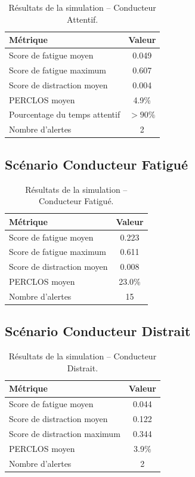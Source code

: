 \documentclass[12pt,a4paper,twoside]{report}
\begin{document}
\begin{table}[H]
\centering
\caption{Résultats de la simulation -- Conducteur Attentif.}
\label{tab:sim_attentif}
\renewcommand{\arraystretch}{1.3}
\begin{tabular}{|l|c|}
\hline
\rowcolor{green!15}
\textbf{Métrique} & \textbf{Valeur} \\
\hline
Score de fatigue moyen & 0.049 \\
\hline
Score de fatigue maximum & 0.607 \\
\hline
Score de distraction moyen & 0.004 \\
\hline
PERCLOS moyen & 4.9\% \\
\hline
Pourcentage du temps attentif & $> 90\%$ \\
\hline
Nombre d'alertes & 2 \\
\hline
\end{tabular}
\end{table}

\subsection{Scénario Conducteur Fatigué}

\begin{table}[H]
\centering
\caption{Résultats de la simulation -- Conducteur Fatigué.}
\label{tab:sim_fatigue}
\renewcommand{\arraystretch}{1.3}
\begin{tabular}{|l|c|}
\hline
\rowcolor{alertorange!20}
\textbf{Métrique} & \textbf{Valeur} \\
\hline
Score de fatigue moyen & 0.223 \\
\hline
Score de fatigue maximum & 0.611 \\
\hline
Score de distraction moyen & 0.008 \\
\hline
PERCLOS moyen & 23.0\% \\
\hline
Nombre d'alertes & 15 \\
\hline
\end{tabular}
\end{table}

\subsection{Scénario Conducteur Distrait}

\begin{table}[H]
\centering
\caption{Résultats de la simulation -- Conducteur Distrait.}
\label{tab:sim_distrait}
\renewcommand{\arraystretch}{1.3}
\begin{tabular}{|l|c|}
\hline
\rowcolor{purple!15}
\textbf{Métrique} & \textbf{Valeur} \\
\hline
Score de fatigue moyen & 0.044 \\
\hline
Score de distraction moyen & 0.122 \\
\hline
Score de distraction maximum & 0.344 \\
\hline
PERCLOS moyen & 3.9\% \\
\hline
Nombre d'alertes & 2 \\
\hline
\end{tabular}
\end{table}
\end{document}
